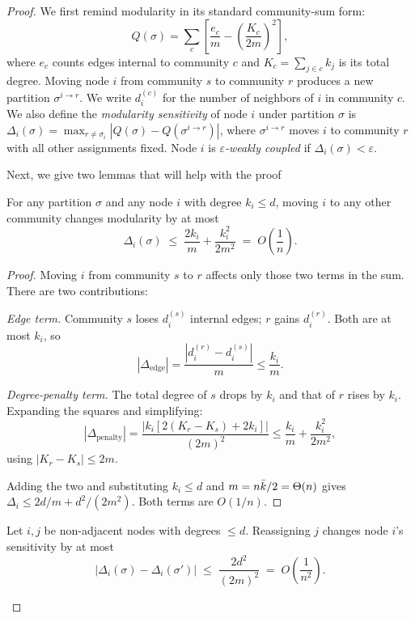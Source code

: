 \begin{proof}
We first remind modularity in its standard community-sum form:
\[
Q(\sigma) = \sum_{c} \left[\frac{e_c}{m} - \left(\frac{K_c}{2m}\right)^{\!2}\right],
\]
where $e_c$ counts edges internal to community $c$ and $K_c = \sum_{j \in c} k_j$ is its total degree. Moving node $i$ from community $s$ to community $r$ produces a new partition $\sigma^{i \to r}$. We write $d_i^{(c)}$ for the number of neighbors of $i$ in community $c$.
We also define the \emph{modularity sensitivity} of node $i$ under partition $\sigma$ is $\Delta_i(\sigma) = \max_{r \neq \sigma_i} |Q(\sigma) - Q(\sigma^{i \to r})|$, where $\sigma^{i \to r}$ moves $i$ to community $r$ with all other assignments fixed. Node $i$ is \emph{$\varepsilon$-weakly coupled} if $\Delta_i(\sigma) < \varepsilon$.

Next, we give two lemmas that will help with the proof

\begin{lemma}\label{lem:one}
For any partition $\sigma$ and any node $i$ with degree $k_i \leq d$, moving $i$ to any other community changes modularity by at most
\[
\Delta_i(\sigma) \;\leq\; \frac{2k_i}{m} + \frac{k_i^2}{2m^2} \;=\; O\!\left(\frac{1}{n}\right).
\]
\end{lemma}

\begin{proof}
Moving $i$ from community $s$ to $r$ affects only those two terms in the sum. There are two contributions:

\medskip
\noindent\textit{Edge term.} Community $s$ loses $d_i^{(s)}$ internal edges; $r$ gains $d_i^{(r)}$. Both are at most $k_i$, so
\[
|\Delta_{\mathrm{edge}}| = \frac{|d_i^{(r)} - d_i^{(s)}|}{m} \leq \frac{k_i}{m}.
\]

\noindent\textit{Degree-penalty term.} The total degree of $s$ drops by $k_i$ and that of $r$ rises by $k_i$. Expanding the squares and simplifying:
\[
|\Delta_{\mathrm{penalty}}| = \frac{|k_i[2(K_r - K_s) + 2k_i]|}{(2m)^2} \leq \frac{k_i}{m} + \frac{k_i^2}{2m^2},
\]
using $|K_r - K_s| \leq 2m$.

\medskip
\noindent Adding the two and substituting $k_i \leq d$ and $m = n\bar{k}/2 = \Theta(n)$ gives $\Delta_i \leq 2d/m + d^2/(2m^2)$. Both terms are $O(1/n)$.
\end{proof}

\begin{lemma}\label{lem:two}
Let $i,j$ be non-adjacent nodes with degrees $\leq d$. Reassigning $j$ changes node $i$'s sensitivity by at most
\[
|\Delta_i(\sigma) - \Delta_i(\sigma')| \;\leq\; \frac{2d^2}{(2m)^2} \;=\; O\!\left(\frac{1}{n^2}\right).
\]
\end{lemma}


\end{proof}

